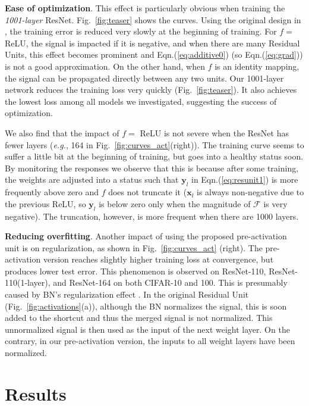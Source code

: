 \documentclass[runningheads]{llncs}
\def\eg{\emph{e.g.}}
\newcommand{\ve}[1]{\mathbf{#1}} %
\begin{document}
\textbf{Ease of optimization}. This effect is particularly obvious when training the \emph{1001-layer} ResNet. Fig.~\ref{fig:teaser} shows the curves. Using the original design in \cite{He2016}, the training error is reduced very slowly at the beginning of training. For $f=$ ReLU, the signal is impacted if it is negative, and when there are many Residual Units, this effect becomes prominent and Eqn.(\ref{eq:additive0}) (so Eqn.(\ref{eq:grad})) is not a good approximation. On the other hand, when $f$ is an identity mapping, the signal can be propagated directly between any two units. Our 1001-layer network reduces the training loss very quickly (Fig.~\ref{fig:teaser}). It also achieves the lowest loss among all models we investigated, suggesting the success of optimization.

We also find that the impact of $f=$ ReLU is not severe when the ResNet has fewer layers (\eg, 164 in Fig.~\ref{fig:curves_act}(right)). The training curve seems to suffer a little bit at the beginning of training, but goes into a healthy status soon. By monitoring the responses we observe that this is because after some training, the weights are adjusted into a status such that $\ve{y}_l$ in Eqn.(\ref{eq:resunit1}) is more frequently above zero and $f$ does not truncate it ($\ve{x}_l$ is always non-negative due to the previous ReLU, so $\ve{y}_l$ is below zero only when the magnitude of $\mathcal{F}$ is very negative). The truncation, however, is more frequent when there are 1000 layers.

\textbf{Reducing overfitting}. Another impact of using the proposed pre-activation unit is on regularization, as shown in Fig.~\ref{fig:curves_act} (right). The pre-activation version reaches slightly higher training loss at convergence, but produces lower test error. This phenomenon is observed on ResNet-110, ResNet-110(1-layer), and ResNet-164 on both CIFAR-10 and 100. This is presumably caused by BN's regularization effect \cite{Ioffe2015}. In the original Residual Unit (Fig.~\ref{fig:activations}(a)), although the BN normalizes the signal, this is soon added to the shortcut and thus the merged signal is not normalized. This unnormalized signal is then used as the input of the next weight layer. On the contrary, in our pre-activation version, the inputs to all weight layers have been normalized.

\hypersetup{urlcolor=magenta}

\section{Results}
\end{document}
